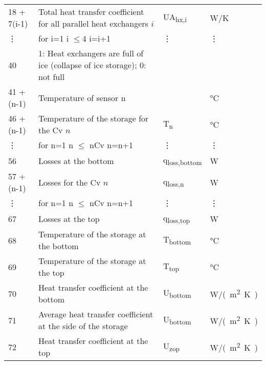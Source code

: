 \documentclass[english]{SPFReport}
\begin{document}
\begin{longtable}{| l |  m{8cm} | l | l |}
\small{18 + 7(i-1)} & Total heat transfer coefficient for all parallel heat exchangers $i$ & \si{UA_{hx,i}} & W/K\\
\vdots   &  for i=1 i $\leq$4 i=i+1 & \vdots & \vdots\\
40 & 1: Heat exchangers are full of ice (collapse of ice storage); 0: not full &  & \\
41 +(n-1) & Temperature of sensor n &&\si{\degreeCelsius}\\
46 +(n-1) & Temperature of the storage for the Cv $n$ & \si{T_{n}} & \si{\degreeCelsius}   \\
\vdots   &  for n=1 n $\leq$ nCv n=n+1 & \vdots & \vdots \\
56 & Losses at the bottom & \si{q_{loss,bottom}} & W   \\
57 +(n-1) & Losses for the Cv $n$ & \si{q_{loss,n}} & W   \\
\vdots   &  for n=1 n $\leq$ nCv n=n+1 & \vdots & \vdots \\
67 & Losses at the top & \si{q_{loss,top}} & W  \\
68 & Temperature of the storage at the bottom & \si{T_{bottom}} & \si{\degreeCelsius}   \\
69 & Temperature of the storage at the top & \si{T_{top}} & \si{\degreeCelsius}   \\
70 & Heat transfer coefficient at the bottom & \si{U_{bottom}} & \si{W/(m^2K)}\\
71 & Average heat transfer coefficient at the side of the storage & \si{U_{bottom}} &  \si{W/(m^2K)} \\
72 & Heat transfer coefficient at the top & \si{U_{zop}} & \si{W/(m^2K)} \\
\hline
\end{longtable}




\clearpage


\end{document}
